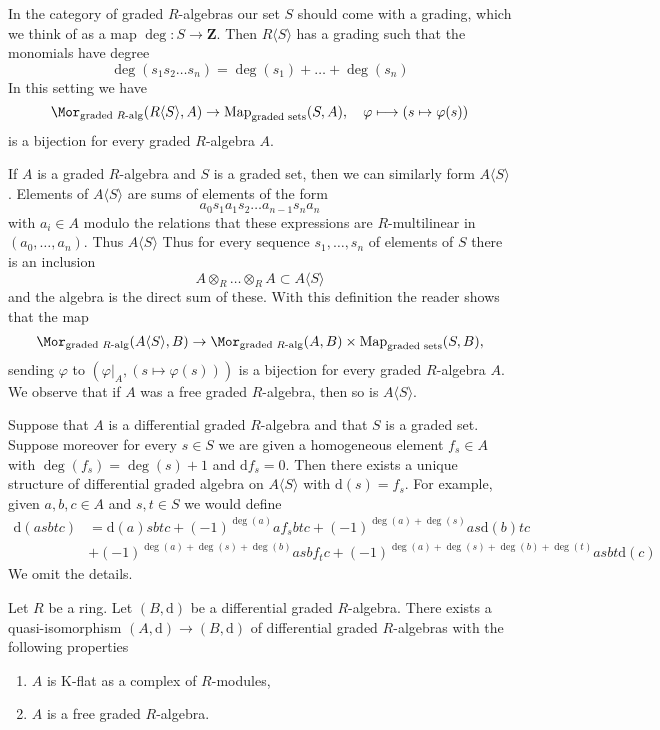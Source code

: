 \medskip\noindent
In the category of graded $R$-algebras our set $S$ should come
with a grading, which we think of as a map $\deg : S \to \mathbf{Z}$.
Then $R\langle S\rangle$ has a grading such that the monomials
have degree
$$
\deg(s_1 s_2 \ldots s_n) = \deg(s_1) + \ldots + \deg(s_n)
$$
In this setting we have
$$
\Mor_{\text{graded }R\text{-alg}}(R\langle S \rangle, A) \to
\text{Map}_{\text{graded sets}}(S, A),\quad
\varphi \longmapsto (s \mapsto \varphi(s))
$$
is a bijection for every graded $R$-algebra $A$.

\medskip\noindent
If $A$ is a graded $R$-algebra and $S$ is a graded set,
then we can similarly form $A\langle S \rangle$.
Elements of $A\langle S \rangle$ are
sums of elements of the form
$$
a_0 s_1 a_1 s_2 \ldots a_{n - 1} s_n a_n
$$
with $a_i \in A$ modulo the relations that these expressions
are $R$-multilinear in $(a_0, \ldots, a_n)$. Thus $A\langle S \rangle$
Thus for every sequence $s_1, \ldots, s_n$ of elements of $S$
there is an inclusion
$$
A \otimes_R \ldots \otimes_R A \subset A\langle S \rangle
$$
and the algebra is the direct sum of these. With this definition the
reader shows that the map
$$
\Mor_{\text{graded }R\text{-alg}}(A\langle S \rangle, B) \to
\Mor_{\text{graded }R\text{-alg}}(A, B) \times
\text{Map}_{\text{graded sets}}(S, B),
$$
sending $\varphi$ to $(\varphi|_A, (s \mapsto \varphi(s)))$
is a bijection for every graded $R$-algebra $A$.
We observe that if $A$ was a free graded $R$-algebra,
then so is $A\langle S \rangle$.

\medskip\noindent
Suppose that $A$ is a differential graded $R$-algebra and
that $S$ is a graded set. Suppose moreover for every $s \in S$
we are given a homogeneous element $f_s \in A$ with $\deg(f_s) = \deg(s) + 1$
and $\text{d}f_s = 0$. Then there exists a unique structure of
differential graded algebra on $A\langle S \rangle$ with
$\text{d}(s) = f_s$. For example, given $a, b, c \in A$ and
$s, t \in S$ we would define
\begin{align*}
\text{d}(asbtc)
& =
\text{d}(a)sbtc + (-1)^{\deg(a)}a f_s b t c +
(-1)^{\deg(a) + \deg(s)} as\text{d}(b)tc \\
& + (-1)^{\deg(a) + \deg(s) + \deg(b)} asb f_t c +
(-1)^{\deg(a) + \deg(s) + \deg(b) + \deg(t)} asbt\text{d}(c)
\end{align*}
We omit the details.

\begin{lemma}
\label{lemma-K-flat-resolution}
Let $R$ be a ring. Let $(B, \text{d})$ be a differential graded $R$-algebra.
There exists a quasi-isomorphism $(A, \text{d}) \to (B, \text{d})$ of
differential graded $R$-algebras with the following properties
\begin{enumerate}
\item $A$ is K-flat as a complex of $R$-modules,
\item $A$ is a free graded $R$-algebra.
\end{enumerate}
\end{lemma}

